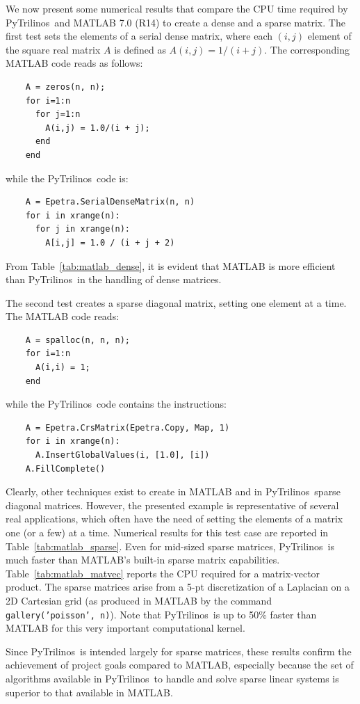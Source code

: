 \documentclass[acmtocl]{acmtrans2m}
\newcommand{\PyTrilinos}{{PyTrilinos}}
\begin{document}
We now present some numerical results that compare the CPU time
required by \PyTrilinos\ and MATLAB 7.0 (R14) to create a dense and a
sparse matrix.  The first test sets the elements of a serial dense
matrix, where each $(i,j)$ element of the square real matrix $A$ is
defined as $A(i,j) = 1/(i + j)$.  The corresponding MATLAB code reads
as follows:
\begin{verbatim}
    A = zeros(n, n);
    for i=1:n
      for j=1:n
        A(i,j) = 1.0/(i + j);
      end
    end
\end{verbatim}
while the \PyTrilinos\ code is:
\begin{verbatim}
    A = Epetra.SerialDenseMatrix(n, n)
    for i in xrange(n):
      for j in xrange(n):
        A[i,j] = 1.0 / (i + j + 2)
\end{verbatim}
From Table~\ref{tab:matlab_dense}, it is evident that MATLAB is more
efficient than \PyTrilinos\ in the handling of dense matrices.

The second test creates a sparse diagonal matrix, setting one element
at a time.  The MATLAB code reads:
\begin{verbatim}
    A = spalloc(n, n, n);
    for i=1:n
      A(i,i) = 1;
    end
\end{verbatim}
while the \PyTrilinos\ code contains the instructions:
\begin{verbatim}
    A = Epetra.CrsMatrix(Epetra.Copy, Map, 1)
    for i in xrange(n):
      A.InsertGlobalValues(i, [1.0], [i])
    A.FillComplete()
\end{verbatim}
Clearly, other techniques exist to create in MATLAB and in
\PyTrilinos\ sparse diagonal matrices.  However, the presented example
is representative of several real applications, which often have the
need of setting the elements of a matrix one (or a few) at a time.
Numerical results for this test case are reported in
Table~\ref{tab:matlab_sparse}.  Even for mid-sized sparse matrices,
\PyTrilinos\ is much faster than MATLAB's built-in sparse matrix
capabilities.  Table~\ref{tab:matlab_matvec} reports the CPU required
for a matrix-vector product.  The sparse matrices arise from a 5-pt
discretization of a Laplacian on a 2D Cartesian grid (as produced in
MATLAB by the command {\tt gallery('poisson', n)}).  Note that
\PyTrilinos\ is up to 50\% faster than MATLAB for this very important
computational kernel.

Since \PyTrilinos\ is intended largely for sparse matrices, these
results confirm the achievement of project goals compared to MATLAB,
especially because the set of algorithms available in \PyTrilinos\ to
handle and solve sparse linear systems is superior to that available
in MATLAB.
\end{document}
